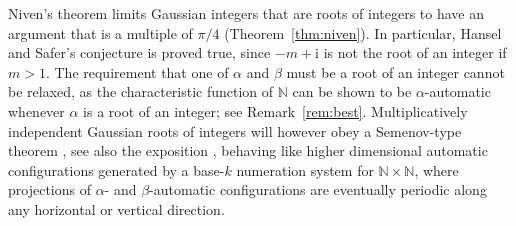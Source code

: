 \documentclass{amsart}
\newcommand{\N}{\mathbb{N}}
\newcommand{\ii}{\mathrm{i}}
\newtheorem*{main theorem}{Theorem \ref{thm:main-gaussian}}
\theoremstyle{definition}
\begin{document}
Niven's theorem limits Gaussian integers that are roots of integers  to have an argument that is a multiple of $\pi/4$ (Theorem~\ref{thm:niven}).
In particular, Hansel and Safer's conjecture is proved true, since $-m+\ii $ is not the root of an integer if $m>1$. 
 The requirement that one of $\alpha$ and $\beta$ must be a  root of an integer cannot be relaxed, as the characteristic function of $\mathbb N$  can be shown to be $\alpha$-automatic whenever $\alpha$ is a root of an integer; see Remark~\ref{rem:best}. Multiplicatively independent Gaussian roots of integers will however obey a Semenov-type theorem \cite{Semenov,Muchnik}, see also the exposition \cite{BHMV1}, behaving like higher dimensional automatic configurations generated by a base-$k$ numeration system for $\mathbb N\times \mathbb N$, where projections of  $\alpha$- and $\beta$-automatic configurations are eventually periodic along any horizontal or vertical  direction.

%
\end{document}
